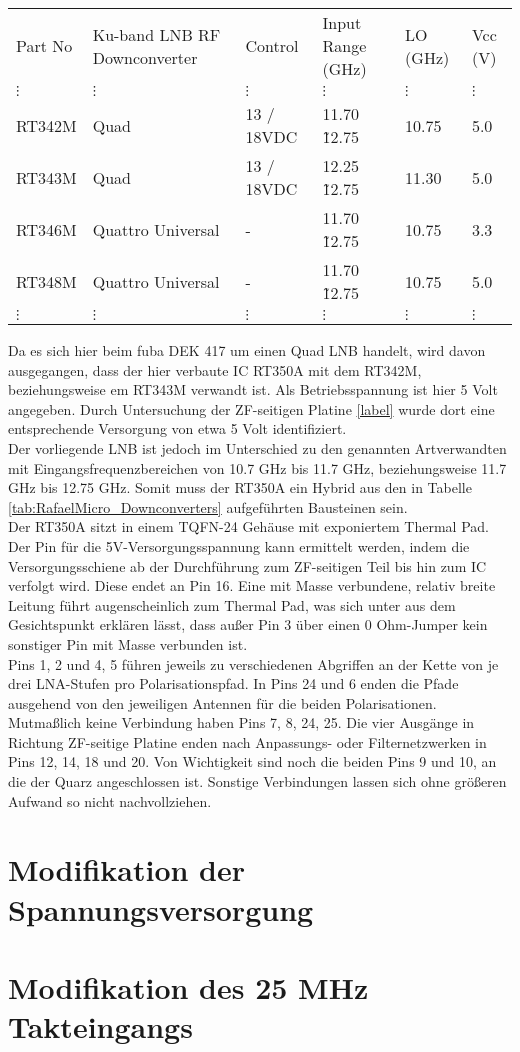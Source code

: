 \documentclass[]{article}
\begin{document}
		{\scriptsize
			\begin{tabular}{llllll}
				Part No & Ku-band LNB RF Downconverter & Control & Input Range (GHz) & LO (GHz) & Vcc (V)\\
				$\vdots$ & $\vdots$ & $\vdots$ & $\vdots$ & $\vdots$ & $\vdots$\\
				RT342M & Quad & 13 / 18VDC & 11.70 \~ 12.75 & 10.75 & 5.0\\
				RT343M & Quad & 13 / 18VDC & 12.25 \~ 12.75 & 11.30 & 5.0\\
				RT346M & Quattro Universal & - & 11.70 \~ 12.75 & 10.75 & 3.3\\
				RT348M & Quattro Universal & - & 11.70 \~ 12.75 & 10.75 & 5.0\\
				$\vdots$ & $\vdots$ & $\vdots$ & $\vdots$ & $\vdots$ & $\vdots$
			\end{tabular}
		}\phantom{}\linebreak
		
		
		\noindent Da es sich hier beim fuba DEK 417 um einen Quad LNB handelt, wird davon ausgegangen, dass der hier verbaute IC RT350A mit dem RT342M, beziehungsweise em RT343M verwandt ist. Als Betriebsspannung ist hier 5 Volt angegeben. Durch Untersuchung der ZF-seitigen Platine \ref{label} wurde dort eine entsprechende Versorgung von etwa 5 Volt identifiziert.\\
		
		\noindent Der vorliegende LNB ist jedoch im Unterschied zu den genannten Artverwandten mit Eingangsfrequenzbereichen von 10.7 GHz bis 11.7 GHz, beziehungsweise 11.7 GHz bis 12.75 GHz. Somit muss der RT350A ein Hybrid aus den in Tabelle \ref{tab:RafaelMicro_Downconverters} aufgeführten Bausteinen sein.\\
		
		\noindent Der RT350A sitzt in einem TQFN-24 Gehäuse mit exponiertem Thermal Pad. Der Pin für die 5V-Versorgungsspannung kann ermittelt werden, indem die Versorgungsschiene ab der Durchführung zum ZF-seitigen Teil bis hin zum IC verfolgt wird. Diese endet an Pin 16. Eine mit Masse verbundene, relativ breite Leitung führt augenscheinlich zum Thermal Pad, was sich unter aus dem Gesichtspunkt erklären lässt, dass außer Pin 3 über einen 0 Ohm-Jumper kein sonstiger Pin mit Masse verbunden ist.\\
		
		\noindent Pins 1, 2 und 4, 5 führen jeweils zu verschiedenen Abgriffen an der Kette von je drei LNA-Stufen pro Polarisationspfad. In Pins 24 und 6 enden die Pfade ausgehend von den jeweiligen Antennen für die beiden Polarisationen. Mutmaßlich keine Verbindung haben Pins 7, 8, 24, 25. Die vier Ausgänge in Richtung ZF-seitige Platine enden nach Anpassungs- oder Filternetzwerken in Pins 12, 14, 18 und 20. Von Wichtigkeit sind noch die beiden Pins 9 und 10, an die der Quarz angeschlossen ist. Sonstige Verbindungen lassen sich ohne größeren Aufwand so nicht nachvollziehen.
	
	\section{Modifikation der Spannungsversorgung}
	
	
	\section{Modifikation des 25 MHz Takteingangs}
\end{document}
